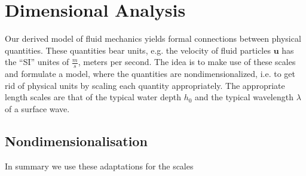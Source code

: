 \section{Dimensional Analysis}
Our derived model of fluid mechanics yields formal connections between
physical quantities. These quantities bear units, e.g. the velocity of fluid
particles $\mathbf{u}$ has the ``SI'' unites of $\frac{m}{s}$, meters per
second. The idea is to make use of these scales and formulate a model, where
the quantities are nondimensionalized, i.e. to get rid of physical units by
scaling each quantity appropriately. The appropriate length scales are that
of the typical water depth $h_0$ and the typical wavelength $\lambda$ of a
surface wave.

\subsection{Nondimensionalisation\label{sec:nondim}}
In summary we use these adaptations for the scales

